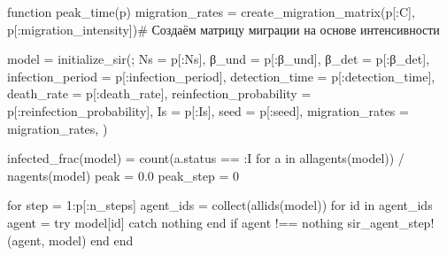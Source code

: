 \documentclass[
  12pt,
  a4paper,
  DIV=11,
  numbers=noendperiod]{scrreprt}
\newenvironment{Shaded}{\begin{snugshade}}{\end{snugshade}}
\newcommand{\CommentTok}[1]{\textcolor[rgb]{0.37,0.37,0.37}{#1}}
\newcommand{\ConstantTok}[1]{\textcolor[rgb]{0.56,0.35,0.01}{#1}}
\newcommand{\ControlFlowTok}[1]{\textcolor[rgb]{0.00,0.23,0.31}{#1}}
\newcommand{\FloatTok}[1]{\textcolor[rgb]{0.68,0.00,0.00}{#1}}
\newcommand{\FunctionTok}[1]{\textcolor[rgb]{0.28,0.35,0.67}{#1}}
\newcommand{\KeywordTok}[1]{\textcolor[rgb]{0.00,0.23,0.31}{#1}}
\newcommand{\NormalTok}[1]{\textcolor[rgb]{0.00,0.23,0.31}{#1}}
\newcommand{\OperatorTok}[1]{\textcolor[rgb]{0.37,0.37,0.37}{#1}}
\begin{document}
\begin{Shaded}
\begin{Highlighting}[]
\KeywordTok{function} \FunctionTok{peak\_time}\NormalTok{(p)}
\NormalTok{    migration\_rates }\OperatorTok{=} \FunctionTok{create\_migration\_matrix}\NormalTok{(p[}\OperatorTok{:}\NormalTok{C], p[}\OperatorTok{:}\NormalTok{migration\_intensity])}\CommentTok{\# Создаём матрицу миграции на основе интенсивности}

\NormalTok{    model }\OperatorTok{=} \FunctionTok{initialize\_sir}\NormalTok{(;}
\NormalTok{        Ns }\OperatorTok{=}\NormalTok{ p[}\OperatorTok{:}\NormalTok{Ns],}
\NormalTok{        β\_und }\OperatorTok{=}\NormalTok{ p[}\OperatorTok{:}\NormalTok{β\_und],}
\NormalTok{        β\_det }\OperatorTok{=}\NormalTok{ p[}\OperatorTok{:}\NormalTok{β\_det],}
\NormalTok{        infection\_period }\OperatorTok{=}\NormalTok{ p[}\OperatorTok{:}\NormalTok{infection\_period],}
\NormalTok{        detection\_time }\OperatorTok{=}\NormalTok{ p[}\OperatorTok{:}\NormalTok{detection\_time],}
\NormalTok{        death\_rate }\OperatorTok{=}\NormalTok{ p[}\OperatorTok{:}\NormalTok{death\_rate],}
\NormalTok{        reinfection\_probability }\OperatorTok{=}\NormalTok{ p[}\OperatorTok{:}\NormalTok{reinfection\_probability],}
\NormalTok{        Is }\OperatorTok{=}\NormalTok{ p[}\OperatorTok{:}\NormalTok{Is],}
\NormalTok{        seed }\OperatorTok{=}\NormalTok{ p[}\OperatorTok{:}\NormalTok{seed],}
\NormalTok{        migration\_rates }\OperatorTok{=}\NormalTok{ migration\_rates,}
\NormalTok{    )}

    \FunctionTok{infected\_frac}\NormalTok{(model) }\OperatorTok{=} \FunctionTok{count}\NormalTok{(a.status }\OperatorTok{==} \OperatorTok{:}\NormalTok{I }\ControlFlowTok{for}\NormalTok{ a }\KeywordTok{in} \FunctionTok{allagents}\NormalTok{(model)) }\OperatorTok{/} \FunctionTok{nagents}\NormalTok{(model)}
\NormalTok{    peak }\OperatorTok{=} \FloatTok{0.0}
\NormalTok{    peak\_step }\OperatorTok{=} \FloatTok{0}

    \ControlFlowTok{for}\NormalTok{ step }\OperatorTok{=} \FloatTok{1}\OperatorTok{:}\NormalTok{p[}\OperatorTok{:}\NormalTok{n\_steps]}
\NormalTok{        agent\_ids }\OperatorTok{=} \FunctionTok{collect}\NormalTok{(}\FunctionTok{allids}\NormalTok{(model))}
        \ControlFlowTok{for}\NormalTok{ id }\KeywordTok{in}\NormalTok{ agent\_ids}
\NormalTok{            agent }\OperatorTok{=} \ControlFlowTok{try}
\NormalTok{                model[id]}
            \ControlFlowTok{catch}
                \ConstantTok{nothing}
            \ControlFlowTok{end}
            \ControlFlowTok{if}\NormalTok{ agent }\OperatorTok{!==} \ConstantTok{nothing}
                \FunctionTok{sir\_agent\_step!}\NormalTok{(agent, model)}
            \ControlFlowTok{end}
        \ControlFlowTok{end}


\end{Highlighting}
\end{Shaded}
\end{document}
